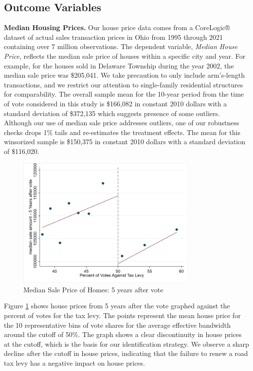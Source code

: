 \subsection{Outcome Variables}

{\bf Median Housing Prices.} Our house price data comes from a CoreLogic® dataset of actual sales transaction prices in Ohio from 1995 through 2021 containing over 7 million observations. The dependent variable, \textit{Median House Price}, reflects the median sale price of houses within a specific city and year. For example, for the houses sold in Delaware Township during the year 2002, the median sale price was \$205,041. We take precaution to only include arm’s-length transactions, and we restrict our attention to single-family residential structures for comparability.  The overall sample mean for the 10-year period from the time of vote considered in this study is \$166,082 in constant 2010 dollars with a standard deviation of \$372,135 which suggests presence of some outliers. Although our use of median sale price addresses outliers, one of our robustness checks drops 1\% tails and re-estimates the treatment effects.  The mean for this winsorized sample is \$150,375 in constant 2010 dollars with a standard deviation of \$116,020. 

\begin{figure}[ht]
    \centering
    \includegraphics[width=0.8\textwidth,keepaspectratio]{images/rd_plot_year_5_after_vote.png}
    \caption{Median Sale Price of Homes: 5 years after vote}
    \label{fig:hp_year5_after}
\end{figure}

Figure \ref{fig:hp_year5_after} shows house prices from 5 years after the vote graphed against the percent of votes for the tax levy. The points represent the mean house price for the 10 representative bins of vote shares for the average effective bandwidth around the cutoff of 50\%. The graph shows a clear discontinuity in house prices at the cutoff, which is the basis for our identification strategy. We observe a sharp decline after the cutoff in house prices, indicating that the failure to renew a road tax levy has a negative impact on house prices.


